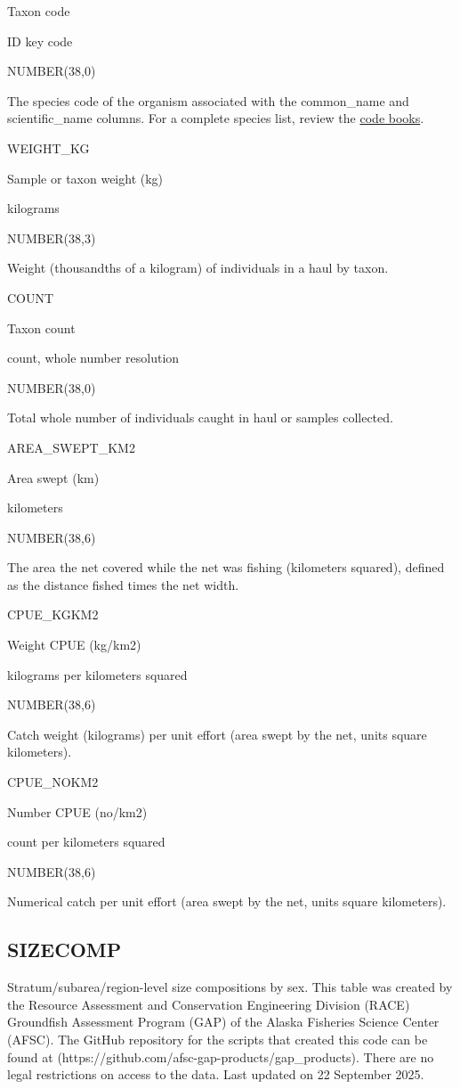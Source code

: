\documentclass[
  letterpaper,
  oneside,
  open=any]{scrbook}
\begin{document}
Taxon code

ID key code

NUMBER(38,0)

The species code of the organism associated with the common\_name and
scientific\_name columns. For a complete species list, review the
\href{https://www.fisheries.noaa.gov/resource/document/groundfish-survey-species-code-manual-and-data-codes-manual}{code
books}.

WEIGHT\_KG

Sample or taxon weight (kg)

kilograms

NUMBER(38,3)

Weight (thousandths of a kilogram) of individuals in a haul by taxon.

COUNT

Taxon count

count, whole number resolution

NUMBER(38,0)

Total whole number of individuals caught in haul or samples collected.

AREA\_SWEPT\_KM2

Area swept (km)

kilometers

NUMBER(38,6)

The area the net covered while the net was fishing (kilometers squared),
defined as the distance fished times the net width.

CPUE\_KGKM2

Weight CPUE (kg/km2)

kilograms per kilometers squared

NUMBER(38,6)

Catch weight (kilograms) per unit effort (area swept by the net, units
square kilometers).

CPUE\_NOKM2

Number CPUE (no/km2)

count per kilometers squared

NUMBER(38,6)

Numerical catch per unit effort (area swept by the net, units square
kilometers).

\subsection{SIZECOMP}\label{sizecomp}

Stratum/subarea/region-level size compositions by sex. This table was
created by the Resource Assessment and Conservation Engineering Division
(RACE) Groundfish Assessment Program (GAP) of the Alaska Fisheries
Science Center (AFSC). The GitHub repository for the scripts that
created this code can be found at
(https://github.com/afsc-gap-products/gap\_products). There are no legal
restrictions on access to the data. Last updated on 22 September 2025.
\end{document}
